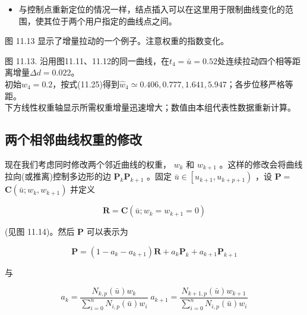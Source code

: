 \documentclass[../main.tex]{subfiles}
\begin{document}
\begin{itemize}
\item 与控制点重新定位的情况一样，结点插入可以在这里用于限制曲线变化的范围，使其位于两个用户指定的曲线点之间。
\end{itemize}

图 11.13 显示了增量拉动的一个例子。注意权重的指数变化。
\begin{center}
\begin{minipage}{26cm}
\centering
{}
\par\smallskip
图 11.13. 沿用图11.11、11.12的同一曲线，在$t_4=\bar u=0.52$处连续拉动四个相等距离增量$\Delta d=0.022$。\\
初始$w_4=0.2$，按式(11.25)得到$\widehat w_4\simeq0.406,0.777,1.641,5.947$；各步位移严格等距。\\
下方线性权重轴显示所需权重增量迅速增大；数值由本组代表性数据重新计算。
\end{minipage}
\end{center}




\subsection{两个相邻曲线权重的修改}

现在我们考虑同时修改两个邻近曲线的权重， \({w}_{k}\) 和 \({w}_{k + 1}\) 。这样的修改会将曲线拉向(或推离)控制多边形的边 \({\mathbf{P}}_{k}{\mathbf{P}}_{k + 1}\) 。固定 \(\bar{u} \in  \left\lbrack  {{u}_{k + 1},{u}_{k + p + 1}}\right)\) ，设 \(\mathbf{P} =\)  \(\mathbf{C}\left( {\bar{u};{w}_{k},{w}_{k + 1}}\right)\) 并定义

\[
\mathbf{R} = \mathbf{C}\left( {\bar{u};{w}_{k} = {w}_{k + 1} = 0}\right)  \tag{11.26}
\]

(见图 11.14)。然后 \(\mathbf{P}\) 可以表示为

\[
\mathbf{P} = \left( {1 - {a}_{k} - {a}_{k + 1}}\right) \mathbf{R} + {a}_{k}{\mathbf{P}}_{k} + {a}_{k + 1}{\mathbf{P}}_{k + 1} \tag{11.27}
\]








与

\[
{a}_{k} = \frac{{N}_{k,p}\left( \bar{u}\right) {w}_{k}}{\mathop{\sum }\limits_{{i = 0}}^{n}{N}_{i,p}\left( \bar{u}\right) {w}_{i}}\;{a}_{k + 1} = \frac{{N}_{k + 1,p}\left( \bar{u}\right) {w}_{k + 1}}{\mathop{\sum }\limits_{{i = 0}}^{n}{N}_{i,p}\left( \bar{u}\right) {w}_{i}} \tag{11.28}
\]
\end{document}

